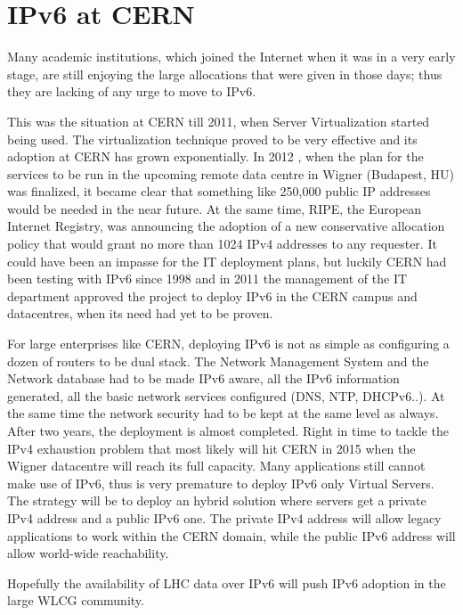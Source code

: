 \section{IPv6 at CERN}
Many academic institutions, which joined the Internet when it was in a very early stage, are still enjoying the large allocations that were given in those days; thus they are lacking of any urge to move to IPv6.
\par 
This was the situation at CERN till 2011, when Server Virtualization started being used. The virtualization technique proved to be very effective and its adoption at CERN has grown exponentially. In 2012 , when the plan for the services to be run in the upcoming remote data centre in Wigner (Budapest, HU) was finalized, it became clear that something like 250,000 public IP addresses would be needed in the near future. At the same time, RIPE, the European Internet Registry, was announcing the adoption of a new conservative allocation policy that would grant no more than 1024 IPv4 addresses to any requester. 
It could have been an impasse for the IT deployment plans, but luckily CERN had been testing with IPv6 since 1998 and in 2011 the management of the IT department approved the project to deploy IPv6 in the CERN campus and datacentres, when its need had yet to be proven.
\par
For large enterprises like CERN, deploying IPv6 is not as simple as configuring a dozen of routers to be dual stack. The Network Management System and the Network database had to be made IPv6 aware, all the IPv6 information generated, all the basic network services configured (DNS, NTP, DHCPv6..). At the same time the network security had to be kept at the same level as always.
After two years, the deployment is almost completed. Right in time to tackle the IPv4 exhaustion problem that most likely will hit CERN in 2015 when the Wigner datacentre will reach its full capacity. 
Many applications still cannot make use of IPv6, thus is very premature to deploy IPv6 only Virtual Servers. The strategy will be to deploy an hybrid solution where servers get a private IPv4 address and a public IPv6 one. The private IPv4 address will allow legacy applications to work within the CERN domain,  while the public IPv6 address will allow world-wide reachability.
\par
Hopefully the availability of LHC data over IPv6 will push IPv6 adoption in the large WLCG community.

